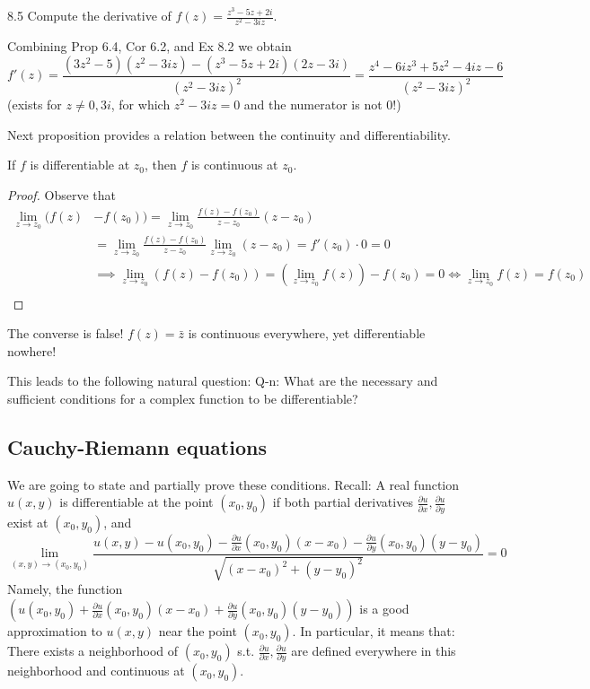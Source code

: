 \begin{example}8.5 Compute the derivative of $f(z) = \frac{z^3 - 5z + 2i}{z^2 - 3iz}$.

\begin{soln}  Combining Prop 6.4, Cor 6.2, and Ex 8.2 we obtain
    \[ f'(z) = \frac{(3z^2 - 5)(z^2 - 3iz) - (z^3 - 5z + 2i)(2z - 3i)}{(z^2 - 3iz)^2} = \frac{z^4 - 6iz^3 + 5z^2 - 4iz - 6}{(z^2 - 3iz)^2} \]
(exists for $z \neq 0, 3i$, for which $z^2 - 3iz = 0$ and the numerator is not 0!)
\end{soln}

\end{example}
Next proposition provides a relation between the continuity and differentiability.

\begin{proposition}\label{proposition:6.5} 
    If $f$ is differentiable at $z_0$, then $f$ is continuous at $z_0$.

    \begin{proof}
 Observe that
\begin{align*} 
    \lim_{z \to z_0} (f(z) &- f(z_0)) = \lim_{z \to z_0} \frac{f(z) - f(z_0)}{z - z_0}(z - z_0) \\ 
    &=  \lim_{z \to z_0}\frac{f(z) - f(z_0)}{z - z_0} \lim_{z \to z_0}(z - z_0) = f'(z_0) \cdot 0 = 0 \\
& \implies \lim_{z \to z_0}(f(z) - f(z_0)) = (\lim_{z \to z_0} f(z)) - f(z_0) = 0 \iff \lim_{z \to z_0} f(z) = f(z_0) \\
\end{align*}
\end{proof}
\end{proposition}

\begin{remark} The converse is false!  $f(z) = \bar{z}$ is continuous everywhere, yet differentiable nowhere!
\end{remark}
This leads to the following natural question:
Q-n: What are the necessary and sufficient conditions for a complex function to be differentiable?

\subsection{Cauchy-Riemann equations}

We are going to state and partially prove these conditions.
Recall: A real function $u(x,y)$ is differentiable at the point $(x_0, y_0)$ if both partial derivatives $\frac{\partial u}{\partial x}, \frac{\partial u}{\partial y}$ exist at $(x_0, y_0)$, and
\[ \lim_{(x,y) \to (x_0, y_0)} \frac{u(x,y) - u(x_0, y_0) - \frac{\partial u}{\partial x}(x_0, y_0)(x-x_0) - \frac{\partial u}{\partial y}(x_0, y_0)(y-y_0)}{\sqrt{(x-x_0)^2 + (y-y_0)^2}} = 0\]
Namely, the function $\left( u(x_0, y_0) + \frac{\partial u}{\partial x}(x_0, y_0)(x-x_0) + \frac{\partial u}{\partial y}(x_0, y_0)(y-y_0) \right)$ is a good approximation to $u(x,y)$ near the point $(x_0, y_0)$.
In particular, it means that: There exists a neighborhood of $(x_0, y_0)$ s.t. $\frac{\partial u}{\partial x}, \frac{\partial u}{\partial y}$ are defined everywhere in this neighborhood and continuous at $(x_0, y_0)$.

